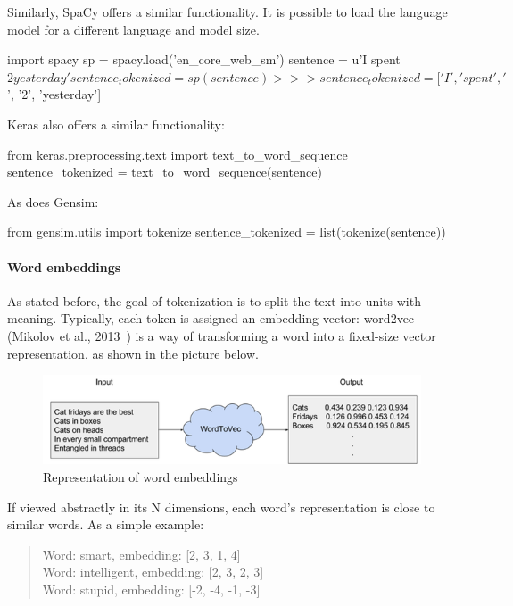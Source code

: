 Similarly, SpaCy offers a similar functionality. It is possible to load the language model for a different language and model size.

\begin{python}
import spacy
sp = spacy.load('en_core_web_sm')
sentence = u'I spent $2 yesterday'
sentence_tokenized = sp(sentence)
>>> sentence_tokenized = ['I', 'spent', '$', '2', 'yesterday']
\end{python}

Keras also offers a similar functionality:

\begin{python}
from keras.preprocessing.text import text_to_word_sequence
sentence_tokenized = text_to_word_sequence(sentence)
\end{python}

As does Gensim:

\begin{python}
from gensim.utils import tokenize
sentence_tokenized = list(tokenize(sentence))
\end{python}

\paragraph{Word embeddings}\label{subsec:wordemb}

As stated before, the goal of tokenization is to split the text into units with meaning. Typically, each token is assigned an embedding vector: word2vec (Mikolov et al., 2013~\cite{mikolov2013efficient}) is a way of transforming a word into a fixed-size vector representation, as shown in the picture below.

\begin{figure}[!ht]
    \centering
    \includegraphics[width=12cm]{figures/word_emb.png}
    \caption{Representation of word embeddings}
\end{figure}

If viewed abstractly in its N dimensions, each word's representation is close to similar words. As a simple example:

\begin{quote}
    Word: smart, embedding: [2, 3, 1, 4]\\
    Word: intelligent, embedding: [2, 3, 2, 3]\\
    Word: stupid, embedding: [-2, -4, -1, -3]
\end{quote}


